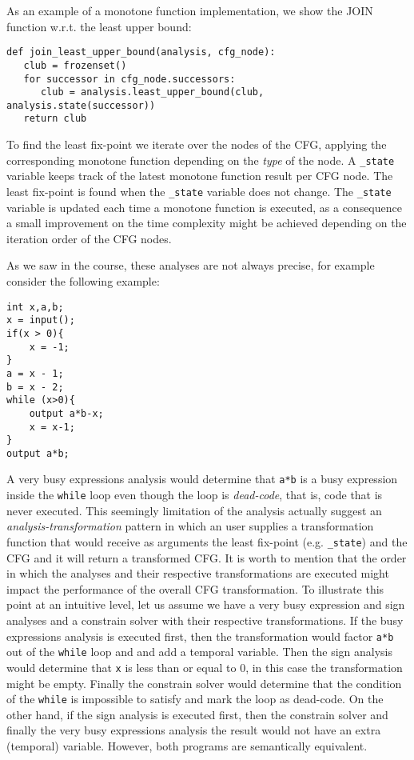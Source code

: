 As an example of a monotone function implementation, we show the JOIN function w.r.t. the least upper bound: 
\begin{verbatim}
def join_least_upper_bound(analysis, cfg_node):
   club = frozenset()
   for successor in cfg_node.successors:
      club = analysis.least_upper_bound(club, analysis.state(successor))
   return club
\end{verbatim}

\newpar To find the least fix-point we iterate over the nodes of the CFG, applying the corresponding monotone function depending on the \emph{type} of the node. A \texttt{\_state} variable keeps track of the latest monotone function result per CFG node. The least fix-point is found when the \texttt{\_state} variable does not change. The \texttt{\_state} variable is updated each time a monotone function is executed, as a consequence a small improvement on the time complexity might be achieved depending on the iteration order of the CFG nodes.

\newpar As we saw in the course, these analyses are not always precise, for example consider the following example:
\begin{verbatim}
int x,a,b;
x = input();
if(x > 0){
	x = -1;
}
a = x - 1;
b = x - 2;
while (x>0){
	output a*b-x;
	x = x-1;
}
output a*b;
\end{verbatim}

\newpar A very busy expressions analysis would determine that \texttt{a*b} is a busy expression inside the \texttt{while} loop even though the loop is \emph{dead-code}, that is, code that is never executed. This seemingly limitation of the analysis actually suggest an \emph{analysis-transformation} pattern in which an user supplies a transformation function that would receive as arguments the least fix-point (e.g. \texttt{\_state}) and the CFG and it will return a transformed CFG. It is worth to mention that the order in which the analyses and their respective transformations are executed might impact the performance of the overall CFG transformation. To illustrate this point at an intuitive level, let us assume we have a very busy expression and sign analyses and a constrain solver with their respective transformations. If the busy expressions analysis is executed first, then the transformation would factor \texttt{a*b} out of the \texttt{while} loop and and add a temporal variable. Then the sign analysis would determine that \texttt{x} is less than or equal to $0$, in this case the transformation might be empty. Finally the constrain solver would determine that the condition of the \texttt{while} is impossible to satisfy and mark the loop as dead-code. On the other hand, if the sign analysis is executed first, then the constrain solver and finally the very busy expressions analysis the result would not have an extra (temporal) variable. However, both programs are semantically equivalent. 

